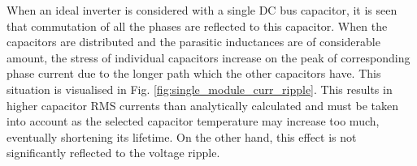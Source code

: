 When an ideal inverter is considered with a single DC bus capacitor, it is seen that commutation of all the phases are reflected to this capacitor. When the capacitors are distributed and the parasitic inductances are of considerable amount, the stress of individual capacitors increase on the peak of corresponding phase current due to the longer path which the other capacitors have. This situation is visualised in Fig. \ref{fig:single_module_curr_ripple}. This results in higher capacitor RMS currents than analytically calculated and must be taken into account as the selected capacitor temperature may increase too much, eventually shortening its lifetime. On the other hand, this effect is not significantly reflected to the voltage ripple.



